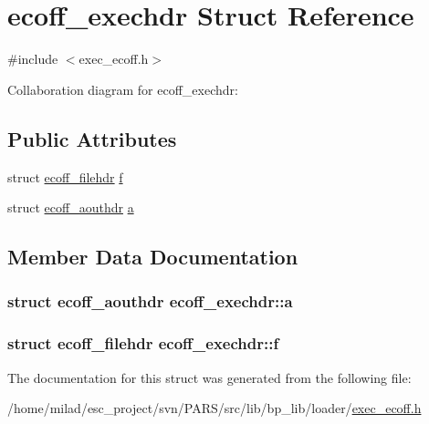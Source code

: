 \hypertarget{structecoff__exechdr}{
\section{ecoff\_\-exechdr Struct Reference}
\label{structecoff__exechdr}
}


{\ttfamily \#include $<$exec\_\-ecoff.h$>$}



Collaboration diagram for ecoff\_\-exechdr:
\subsection*{Public Attributes}
\begin{DoxyCompactItemize}
\item 
struct \hyperlink{structecoff__filehdr}{ecoff\_\-filehdr} \hyperlink{structecoff__exechdr_aac8cdc399b8bab77efd14042f8308942}{f}
\item 
struct \hyperlink{structecoff__aouthdr}{ecoff\_\-aouthdr} \hyperlink{structecoff__exechdr_accf4b0339bf49c73a980523dcb42b2d7}{a}
\end{DoxyCompactItemize}


\subsection{Member Data Documentation}
\hypertarget{structecoff__exechdr_accf4b0339bf49c73a980523dcb42b2d7}{
\subsubsection[{a}]{\setlength{\rightskip}{0pt plus 5cm}struct {\bf ecoff\_\-aouthdr} {\bf ecoff\_\-exechdr::a}}}
\label{structecoff__exechdr_accf4b0339bf49c73a980523dcb42b2d7}
\hypertarget{structecoff__exechdr_aac8cdc399b8bab77efd14042f8308942}{
\subsubsection[{f}]{\setlength{\rightskip}{0pt plus 5cm}struct {\bf ecoff\_\-filehdr} {\bf ecoff\_\-exechdr::f}}}
\label{structecoff__exechdr_aac8cdc399b8bab77efd14042f8308942}


The documentation for this struct was generated from the following file:\begin{DoxyCompactItemize}
\item 
/home/milad/esc\_\-project/svn/PARS/src/lib/bp\_\-lib/loader/\hyperlink{exec__ecoff_8h}{exec\_\-ecoff.h}\end{DoxyCompactItemize}
